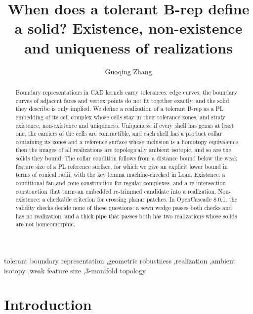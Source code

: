 \documentclass[preprint,12pt]{elsarticle}
\theoremstyle{definition}
\theoremstyle{remark}
\begin{document}
\begin{frontmatter}

\title{When does a tolerant B-rep define a solid? Existence, non-existence and uniqueness of realizations}

\author{Guoqing Zhang}
\address{ZENFLUX, Miami Gardens, Florida, USA}

\begin{abstract}
Boundary representations in CAD kernels carry tolerances: edge curves, the boundary curves of adjacent faces and vertex
points do not fit together exactly, and the solid they describe is only implied. We define a realization of a tolerant
B-rep as a PL embedding of its cell complex whose cells stay in their tolerance zones, and study existence,
non-existence and uniqueness. Uniqueness: if every shell has genus at least one, the carriers of the cells are
contractible, and each shell has a product collar containing its zones and a reference surface whose inclusion is a
homotopy equivalence, then the images of all realizations are topologically ambient isotopic, and so are the solids
they bound. The collar condition follows from a distance bound below the weak feature size of a PL reference surface,
for which we give an explicit lower bound in terms of conical radii, with the key lemma machine-checked in Lean.
Existence: a conditional fan-and-cone construction for regular complexes, and a re-intersection construction that
turns an embedded re-trimmed candidate into a realization. Non-existence: a checkable criterion for crossing planar
patches. In OpenCascade 8.0.1, the validity checks decide none of these questions: a sewn wedge passes both checks and
has no realization, and a thick pipe that passes both has two realizations whose solids are not homeomorphic.
\end{abstract}

\begin{keyword}
tolerant boundary representation \sep geometric robustness \sep realization \sep ambient isotopy \sep weak feature
size \sep 3-manifold topology
\end{keyword}

\end{frontmatter}

\section{Introduction}\label{sec:intro}
\end{document}
